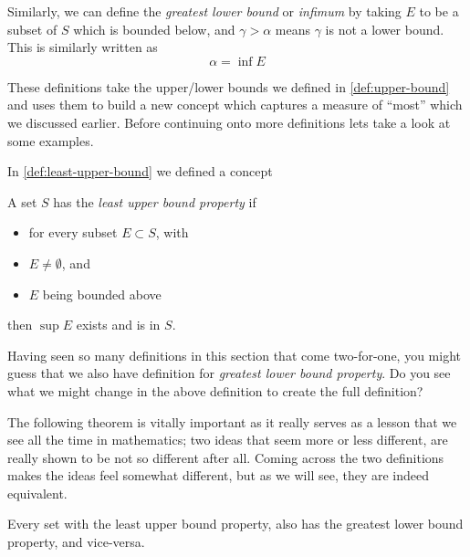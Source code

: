 \documentclass[../../templates/section]{subfiles}
\begin{document}
Similarly, we can define the \emph{greatest lower bound} or \emph{infimum} by
taking $E$ to be a subset of $S$ which is bounded below, and $\gamma > \alpha$
means $\gamma$ is not a lower bound. This is similarly written as
\[\alpha = \inf{E}\]

These definitions take the upper/lower bounds we defined in \cref{def:upper-bound} and uses them to build a new concept which captures a
measure of ``most'' which we discussed earlier. Before continuing onto more
definitions lets take a look at some examples.

\begin{example}
\end{example}

In \cref{def:least-upper-bound} we defined a concept 

\begin{definition}\label{def:least-upper-bound-prop}
    A set $S$ has the \emph{least upper bound property} if
    \begin{itemize}
        \item for every subset $E\subset S$, with
        \item $E\neq\emptyset$, and
        \item $E$ being bounded above
    \end{itemize}
    then $\sup{E}$ exists and is in $S$.
\end{definition}

Having seen so many definitions in this section that come two-for-one, you might
guess that we also have definition for \emph{greatest lower bound property}. Do
you see what we might change in the above definition to create the full
definition?

The following theorem is vitally important as it really serves as a lesson that
we see all the time in mathematics; two ideas that seem more or less different,
are really shown to be not so different after all. Coming across the two
definitions makes the ideas feel somewhat different, but as we will see, they
are indeed equivalent.

\begin{theorem}
    Every set with the least upper bound property, also has the greatest lower
    bound property, and vice-versa.
\end{theorem}
\end{document}
